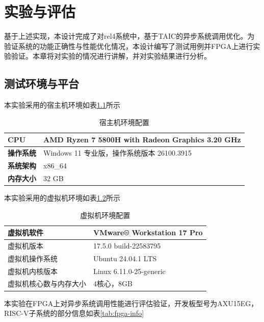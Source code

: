 \chapter{实验与评估}

基于上述实现，本设计完成了对rel4系统中，基于TAIC的异步系统调用优化。为验证系统的功能正确性与性能优化情况，本设计编写了测试用例并FPGA上进行实验验证。本章将对实验的情况进行讲解，并对实验结果进行分析。

\section{测试环境与平台}

本实验采用的宿主机环境如表\ref{tab:experiment-platform}所示

\begin{table}[htbp]
\centering
\caption{宿主机环境配置}\label{tab:experiment-platform}
\renewcommand{\arraystretch}{1.2}
\begin{tabular}{|l|l|}
\hline
\textbf{CPU} & AMD Ryzen 7 5800H with Radeon Graphics 3.20 GHz \\
\hline
\textbf{操作系统} & Windows 11 专业版，操作系统版本	26100.3915 \\
\hline
\textbf{系统架构} & x86\_64 \\
\hline
\textbf{内存大小} & 32 GB \\
\hline
\end{tabular}
\end{table}


本实验采用的虚拟机环境如表\ref{tab:vmware-platform}所示

\begin{table}[htbp]
\centering
\caption{虚拟机环境配置}\label{tab:vmware-platform}
\renewcommand{\arraystretch}{1.2}
\begin{tabular}{|l|l|}
\hline
虚拟机软件 & VMware® Workstation 17 Pro \\
\hline
虚拟机版本 & 17.5.0 build-22583795 \\
\hline
虚拟机操作系统 & Ubuntu 24.04.1 LTS \\
\hline
虚拟机内核版本 & Linux 6.11.0-25-generic \\
\hline
虚拟机核心数与内存大小 & 4核心，8GB \\
\hline
\end{tabular}
\end{table}

本实验在FPGA上对异步系统调用性能进行评估验证，开发板型号为AXU15EG，RISC-V子系统的部分信息如表\ref{tab:fpga-info}

